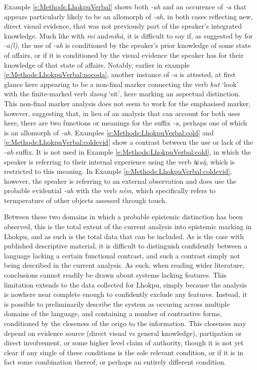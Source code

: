 Example \ref{e:Methods:LhokpuVerbal} shows both \textit{-ah} and an occurence of \textit{-a} that appears particularly likely to be an allomorph of \textit{-ah}, in both cases reflecting new, direct visual evidence, that was not previously part of the speaker's integrated knowledge. Much like with \textit{mi} and\textit{mihã}, it is difficult to say if, as suggested by  for \textit{-a(l)}, the use of \textit{-ah} is conditioned by the speaker's prior knowledge of some state of affairs, or if it is conditioned by the visual evidence the speaker has for their knowledge of that state of affairs. Notably, earlier in example \ref{e:Methods:LhokpuVerbal:nocoda}, another instance of \textit{-a} is attested, at first glance here appearing to be a non-final marker connecting the verb \textit{hut} `look' with the finite-marked verb \textit{dzong} `sit', here marking an aspectual distinction. This non-final marker analysis does not seem to work for the emphasised marker, however, suggesting that, in lieu of an analysis that can account for both uses here, there are two functions or meanings for the suffix \textit{-a}, perhaps one of which is an allomorph of \textit{-ah}. Examples \ref{e:Methods:LhokpuVerbal:cold} and \ref{e:Methods:LhokpuVerbal:coldevid} show a contrast between the use or lack of the \textit{-ah} suffix. It is not used in Example \ref{e:Methods:LhokpuVerbal:cold}, in which the speaker is referring to their internal experience using the verb \textit{tɕuŋ̊}, which is restricted to this meaning. In Example \ref{e:Methods:LhokpuVerbal:coldevid}, however, the speaker is referring to an external observation and does use the probable evidential \textit{-ah} with the verb \textit{ném}, which specifically refers to termperature of other objects assessed through touch.

Between these two domains in which a probable epistemic distinction has been observed, this is the total extent of the current analysis into epistemic marking in Lhokpu, and as such is the total data that can be included. As is the case with published descriptive material, it is difficult to distinguish confidently between a language lacking a certain functional contrast, and such a contrast simply not being described in the current analysis. As such, when reading wider literature, conclusions cannot readily be drawn about systems lacking features. This limitation extends to the data collected for Lhokpu, simply because the analysis is nowhere near complete enough to confidently exclude any features. Instead, it is possible to preliminarily describe the system as occuring across multiple domains of the language, and containing a number of contrastive forms, conditioned by the closeness of the origo to the information. This closeness may depend on evidence source (direct visual vs general knowledge), partipation or direct involvement, or some higher level claim of authority, though it is not yet clear if any single of these conditions is the sole relevant condition, or if it is in fact some combination thereof, or perhaps an entirely different condition.